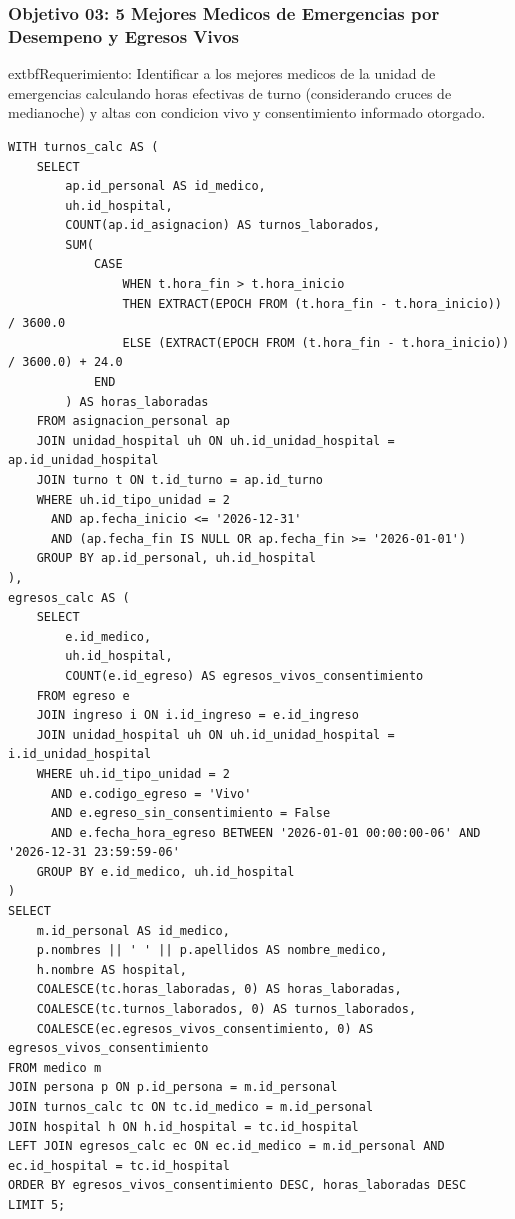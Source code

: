 \documentclass[11pt,a4paper]{article}
\begin{document}
\subsubsection{Objetivo 03: 5 Mejores Medicos de Emergencias por Desempeno y Egresos Vivos}
	extbf{Requerimiento:} Identificar a los mejores medicos de la unidad de emergencias calculando horas efectivas de turno (considerando cruces de medianoche) y altas con condicion vivo y consentimiento informado otorgado.
\begin{lstlisting}[style=sqlstyle]
WITH turnos_calc AS (
    SELECT 
        ap.id_personal AS id_medico,
        uh.id_hospital,
        COUNT(ap.id_asignacion) AS turnos_laborados,
        SUM(
            CASE 
                WHEN t.hora_fin > t.hora_inicio 
                THEN EXTRACT(EPOCH FROM (t.hora_fin - t.hora_inicio)) / 3600.0
                ELSE (EXTRACT(EPOCH FROM (t.hora_fin - t.hora_inicio)) / 3600.0) + 24.0
            END
        ) AS horas_laboradas
    FROM asignacion_personal ap
    JOIN unidad_hospital uh ON uh.id_unidad_hospital = ap.id_unidad_hospital
    JOIN turno t ON t.id_turno = ap.id_turno
    WHERE uh.id_tipo_unidad = 2
      AND ap.fecha_inicio <= '2026-12-31'
      AND (ap.fecha_fin IS NULL OR ap.fecha_fin >= '2026-01-01')
    GROUP BY ap.id_personal, uh.id_hospital
),
egresos_calc AS (
    SELECT 
        e.id_medico,
        uh.id_hospital,
        COUNT(e.id_egreso) AS egresos_vivos_consentimiento
    FROM egreso e
    JOIN ingreso i ON i.id_ingreso = e.id_ingreso
    JOIN unidad_hospital uh ON uh.id_unidad_hospital = i.id_unidad_hospital
    WHERE uh.id_tipo_unidad = 2
      AND e.codigo_egreso = 'Vivo'
      AND e.egreso_sin_consentimiento = False
      AND e.fecha_hora_egreso BETWEEN '2026-01-01 00:00:00-06' AND '2026-12-31 23:59:59-06'
    GROUP BY e.id_medico, uh.id_hospital
)
SELECT 
    m.id_personal AS id_medico,
    p.nombres || ' ' || p.apellidos AS nombre_medico,
    h.nombre AS hospital,
    COALESCE(tc.horas_laboradas, 0) AS horas_laboradas,
    COALESCE(tc.turnos_laborados, 0) AS turnos_laborados,
    COALESCE(ec.egresos_vivos_consentimiento, 0) AS egresos_vivos_consentimiento
FROM medico m
JOIN persona p ON p.id_persona = m.id_personal
JOIN turnos_calc tc ON tc.id_medico = m.id_personal
JOIN hospital h ON h.id_hospital = tc.id_hospital
LEFT JOIN egresos_calc ec ON ec.id_medico = m.id_personal AND ec.id_hospital = tc.id_hospital
ORDER BY egresos_vivos_consentimiento DESC, horas_laboradas DESC
LIMIT 5;
\end{lstlisting}
\end{document}

